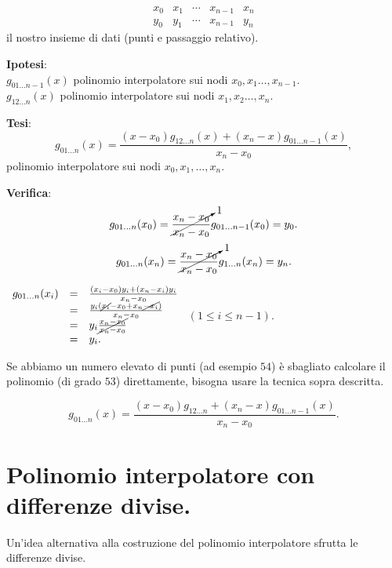 \[\begin{array}{ccccc}
x_0 & x_1 & \cdots & x_{n-1} & x_n   \\
y_0 & y_1 & \cdots & x_{n-1} & y_n
\end{array}\]
il nostro insieme di dati (punti e passaggio relativo).
\begin{flushleft}
\textbf{Ipotesi}: \\
$g_{01\ldots n-1}(x)$ polinomio interpolatore sui nodi $x_0, x_1 \ldots,
x_{n-1}$.\\
$g_{12\ldots n}(x)$ polinomio interpolatore sui nodi $x_1, x_2 \ldots,
x_{n}$.\\
\end{flushleft}
\begin{flushleft}
\textbf{Tesi}:
\[
g_{01\ldots n}(x) = \frac{(x-x_0)g_{12\ldots n}(x) + (x_n-x)g_{01\ldots n-1}(x)}{x_n
- x_0},
\]
polinomio interpolatore sui nodi $x_0, x_1, \ldots, x_n$.
\end{flushleft}
\begin{flushleft}
\textbf{Verifica}:
\[
g_{01\ldots n}(x_0) = \cancelto{1}{\frac{x_n - x_0}{x_n - x_0}}g_{01\ldots n-1}(x_0)
=y_0.
\]
\[
g_{01\ldots n}(x_n) = \cancelto{1}{\frac{x_n - x_0}{x_n - x_0}}g_{1\ldots n}(x_n)
=y_n.
\]

$
\begin{array}{lcl}
 g_{01\ldots n}(x_i) & = &
\frac{(x_i -x_0)y_i + (x_n - x_i)y_i}{x_n - x_0} \\
& = & \frac{y_i(\cancel{x_i} - x_0 + x_n \cancel{-x_i})}{x_n - x_0}\\
& = & y_i\cancel{\frac{x_n - x_0}{x_n - x_0}}\\
& = & y_i.
\end{array}$
$(1 \leq i \leq n-1)$.
\end{flushleft}

Se abbiamo un numero elevato di punti (ad esempio $54$) è sbagliato
calcolare il polinomio (di grado $53$) direttamente, bisogna usare la
tecnica sopra descritta.

\[
g_{01\ldots n}(x) =
\frac{(x-x_0)g_{12\ldots n} + (x_n-x)g_{01\ldots n-1}(x)}{x_n-x_0}.
\]

\section{Polinomio interpolatore con differenze divise.}
Un'idea alternativa alla costruzione del polinomio interpolatore sfrutta
le differenze divise.

